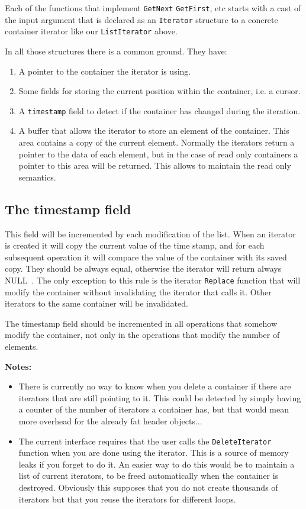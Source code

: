 \documentclass[12pt,a4paper,openany]{memoir} %
\newif\iftth
\newcommand{\notes}{
\par \noindent \textbf{Notes:}\par\noindent}
\newcommand{\Null}{{\iftth \ NULL \else \footnotesize NULL\  \fi}}
\begin{document}
{{\begin{itemize}
Each of the functions that implement \texttt{GetNext} \texttt{GetFirst}, etc starts with a cast of the input argument that is declared as an 
\texttt{Iterator} structure to a concrete container iterator like our \texttt{ListIterator} above.

In all those structures there is a common ground. They have:
\begin{enumerate}
\item A pointer to the container the iterator is using.
\item Some fields for storing the current position within the container, i.e. a cursor.
\item A \texttt{timestamp} field to detect if the container has changed during the iteration.
\item A buffer that allows the iterator to store an element of the container. This area contains a copy of the current element. Normally the
iterators return a pointer to the data of each element, but in the case of read only containers a pointer to this area will be returned. 
This allows to maintain the read only semantics.
\end{enumerate}
\end{itemize}
\subsection{The timestamp field}
This field will be incremented by each modification of the list. When an iterator is created it will copy the current value of the time stamp, and for
each subsequent operation it will compare the value of the container with its saved copy. They should be always equal, otherwise the iterator will
return always \Null. The only exception to this rule is the iterator \verb,Replace, function that will modify the container without invalidating
the iterator that calls it. Other iterators to the same container will be invalidated.

The timestamp field should be incremented in all operations that somehow modify the container, not only in the operations that modify the number of 
elements.
\notes{Implementation issues}
\begin{itemize}
\item
There is currently no way to know when you delete a container if there are iterators that are still
pointing to it. This could be detected by simply having a counter of the number of iterators a container has, but that would mean more overhead for the 
already fat header objects...
\item The current interface requires that the user calls the \verb,DeleteIterator, function when you are done using the iterator. This is
a source of memory leaks if you forget
to do it. An easier way to do this would be to maintain a list of current iterators, to be freed automatically when the container is 
destroyed. Obviously this supposes that you do not create thousands of iterators but that you reuse the iterators for different loops.
\end{itemize}
}}
\end{document}
